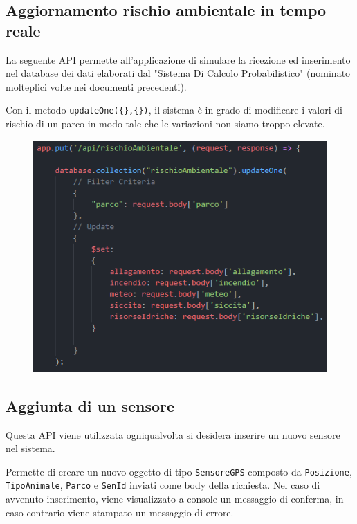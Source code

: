 \subsection{Aggiornamento rischio ambientale in tempo reale}
La seguente API permette all'applicazione di simulare la ricezione ed inserimento nel database dei dati elaborati dal "Sistema Di Calcolo Probabilistico" (nominato molteplici volte nei documenti precedenti).

Con il metodo \texttt{updateOne(\{\},\{\})}, il sistema è in grado di modificare i valori di rischio di un parco in modo tale che le variazioni non siamo troppo elevate.

\begin{figure}[ht]
    \centering
    \includegraphics{Img/putRischio.png}
    \label{put_rischio}
\end{figure}

\newpage

\subsection{Aggiunta di un sensore}
Questa API viene utilizzata ogniqualvolta si desidera inserire un nuovo sensore nel sistema. 

Permette di creare un nuovo oggetto di tipo \texttt{SensoreGPS} composto da \texttt{Posizione}, \texttt{TipoAnimale}, \texttt{Parco} e \texttt{SenId} inviati come body della richiesta. Nel caso di avvenuto inserimento, viene visualizzato a console un messaggio di conferma, in caso contrario viene stampato un messaggio di errore.

